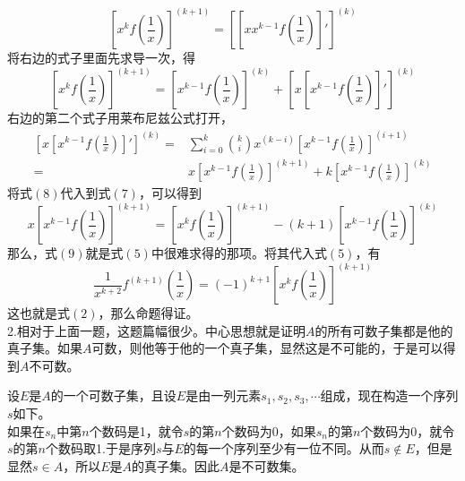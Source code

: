 \documentclass[11pt,a4paper,openany]{article} \usepackage{amssymb,amsfonts, amsmath,ctex,bm}
\begin{document}
\begin{equation}
\left[x^kf\left(\frac{1}{x}\right)\right]^{(k+1)}
=
\left[\left[xx^{k-1}f\left(\frac{1}{x}\right)\right]'\right]^{(k)}
\end{equation}
将右边的式子里面先求导一次，得
\begin{equation}
\left[x^kf\left(\frac{1}{x}\right)\right]^{(k+1)}
=\left[x^{k-1}f\left(\frac{1}{x}\right)\right]^{(k)}
+\left[x\left[x^{k-1}f\left(\frac{1}{x}\right)\right]'\right]^{(k)}
\end{equation}
右边的第二个式子用莱布尼兹公式打开，
\begin{equation}
\begin{split}
\left[x\left[x^{k-1}f\left(\frac{1}{x}\right)\right]'\right]^{(k)}
=&
\sum_{i=0}^{k}{k \choose i}x^{(k-i)}\left[x^{k-1}f\left(\frac{1}{x}\right)\right]^{(i+1)}\\
=&
x\left[x^{k-1}f\left(\frac{1}{x}\right)\right]^{(k+1)}
+
k\left[x^{k-1}f\left(\frac{1}{x}\right)\right]^{(k)}
\end{split}
\end{equation}
将式$(8)$代入到式$(7)$，可以得到
\begin{equation}
x\left[x^{k-1}f\left(\frac{1}{x}\right)\right]^{(k+1)}
=
\left[x^kf\left(\frac{1}{x}\right)\right]^{(k+1)}
-(k+1)\left[x^{k-1}f\left(\frac{1}{x}\right)\right]^{(k)}
\end{equation}
那么，式$(9)$就是式$(5)$中很难求得的那项。将其代入式$(5)$，有
\begin{equation}
\frac{1}{x^{k+2}}f^{(k+1)}\left(\frac{1}{x}\right)
=
(-1)^{k+1}\left[x^kf\left(\frac{1}{x}\right)\right]^{(k+1)}
\end{equation}
这也就是式$(2)$，那么命题得证。\\
2.相对于上面一题，这题篇幅很少。中心思想就是证明$A$的所有可数子集都是他的真子集。如果$A$可数，则他等于他的一个真子集，显然这是不可能的，于是可以得到$A$不可数。

\indent 设$E$是$A$的一个可数子集，且设$E$是由一列元素$s_1,s_2,s_3,\cdots$组成，现在构造一个序列$s$如下。\\
\indent 如果在$s_n$中第$n$个数码是1，就令$s$的第$n$个数码为0，如果$s_n$的第$n$个数码为0，就令$s$的第$n$个数码取1.于是序列$s$与$E$的每一个序列至少有一位不同。从而$s\notin E$，但是显然$s \in A$，所以$E$是$A$的真子集。因此$A$是不可数集。
\end{document}
